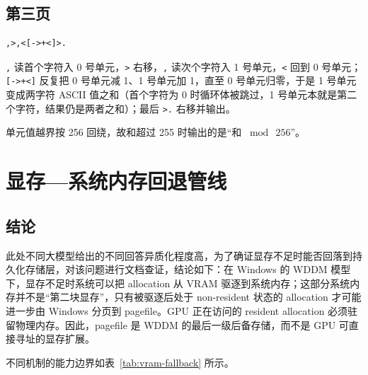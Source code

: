 \documentclass[a4paper, 12pt, linespread=1.35]{ctexart}   %
\begin{document}
\subsection{第三页}

\begin{lstlisting}
,>,<[->+<]>.
\end{lstlisting}

\texttt{,} 读首个字符入 0 号单元，\texttt{>} 右移，\texttt{,} 读次个字符入 1 号单元，\texttt{<} 回到 0 号单元；\texttt{[->+<]} 反复把 0 号单元减 1、1 号单元加 1，直至 0 号单元归零，于是 1 号单元变成两字符 ASCII 值之和（首个字符为 0 时循环体被跳过，1 号单元本就是第二个字符，结果仍是两者之和）；最后 \texttt{>.} 右移并输出。

单元值越界按 256 回绕，故和超过 255 时输出的是“和 $\bmod\ 256$”。

\appendix

\section{显存—系统内存回退管线}
\label{app:vram-fallback}
\subsection{结论}

此处不同大模型给出的不同回答异质化程度高\cite{bao2026reliability}，为了确证显存不足时能否回落到持久化存储层，对该问题进行文档查证，结论如下：在 Windows 的 WDDM 模型下，显存不足时系统可以把 allocation 从 VRAM 驱逐到系统内存；这部分系统内存并不是“第二块显存”，只有被驱逐后处于 non-resident 状态的 allocation 才可能进一步由 Windows 分页到 pagefile。GPU 正在访问的 resident allocation 必须驻留物理内存。因此，pagefile 是 WDDM 的最后一级后备存储，而不是 GPU 可直接寻址的显存扩展。

不同机制的能力边界如表~\ref{tab:vram-fallback} 所示。
\end{document}
